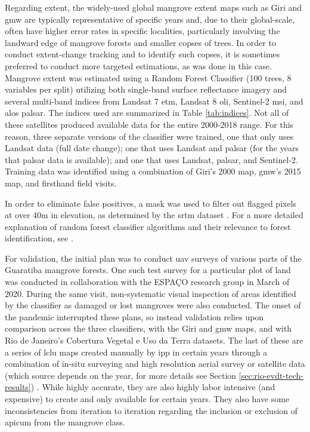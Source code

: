 Regarding extent, the widely-used global mangrove extent maps such as Giri and \ac{gmw} are typically representative of specific years and, due to their global-scale, often have higher error rates in specific localities, particularly involving the landward edge of mangrove forests and smaller copses of trees. In order to conduct extent-change tracking and to identify such copses, it is sometimes preferred to conduct more targeted estimations, as was done in this case. Mangrove extent was estimated using a Random Forest Classifier (100 trees, 8 variables per split) utilizing both single-band surface reflectance imagery and several multi-band indices from Landsat 7 \ac{etm}, Landsat 8 \ac{oli}, Sentinel-2 \ac{msi}, and \ac{alos} \ac{palsar}. The indices used are summarized in Table \ref{tab:indices}. Not all of these satellites produced available data for the entire 2000-2018 range. For this reason, three separate versions of the classifier were trained, one that only uses Landsat data (full date change); one that uses Landsat and \ac{palsar} (for the years that \ac{palsar} data is available); and one that uses Landsat, \ac{palsar}, and Sentinel-2. Training data was identified using a combination of Giri's 2000 map, \ac{gmw}'s 2015 map, and firsthand field visits. 

In order to eliminate false positives, a mask was used to filter out flagged pixels at over 40m in elevation, as determined by the \ac{srtm} dataset \cite{jarvisHolefilledSRTMGlobe2008}. For a more detailed explanation of random forest classifier algorithms and their relevance to forest identification, see \cite{jhonnerieRandomForestClassification2015}.

For validation, the initial plan was to conduct \ac{uav} surveys of various parts of the Guaratiba mangrove forests. One such test survey for a particular plot of land was conducted in collaboration with the ESPAÇO research group in March of 2020. During the same visit, non-systematic visual inspection of areas identified by the classifier as damaged or lost mangroves were also conducted. The onset of the pandemic interrupted these plans, so instead validation relies upon comparison across the three classifiers, with the Giri and \ac{gmw} maps, and with Rio de Janeiro's Cobertura Vegetal e Uso da Terra datasets. The last of these are a series of \ac{lclu} maps created manually by \ac{ipp} in certain years through a combination of in-situ surveying and high resolution aerial survey or satellite data (which source depends on the year, for more details see Section \ref{sec:rio-evdt-tech-results}) \cite{institutopereirapassosCoberturaVegetalUso2021}. While highly accurate, they are also highly labor intensive (and expensive) to create and only available for certain years. They also have some inconsistencies from iteration to iteration regarding the inclusion or exclusion of apicum from the mangrove class.

